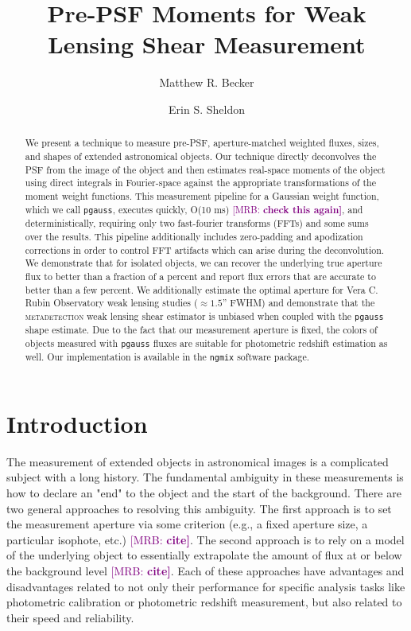 \documentclass[twocolappendix, appendixfloats, numberedappendix, twocolumn, apj]{openjournal}
\newcommand{\mrb}[1]{\textcolor{purple}{[MRB: \bf #1]}\xspace}
\newcommand{\mdet}{\textsc{metadetection}\xspace}
\newcommand{\pgauss}{\texttt{pgauss}\xspace}
\begin{document}
\title{Pre-PSF Moments for Weak Lensing Shear Measurement}

\author{Matthew R. Becker}
\author{Erin S. Sheldon}

\begin{abstract}
  We present a technique to measure pre-PSF, aperture-matched weighted fluxes, sizes,
  and shapes of extended astronomical objects. Our technique directly deconvolves the
  PSF from the image of the object and then estimates real-space moments of the object
  using direct integrals in Fourier-space against the appropriate transformations of the
  moment weight functions. This measurement pipeline for a Gaussian weight function,
  which we call \pgauss, executes quickly, O(10 ms) \mrb{check this again}, and
  deterministically, requiring only two fast-fourier transforms (FFTs) and some sums
  over the results. This pipeline additionally includes zero-padding and apodization
  corrections in order to control FFT artifacts which can arise during the
  deconvolution. We demonstrate that for isolated objects, we can recover the underlying
  true aperture flux to better than a fraction of a percent and report flux errors that
  are accurate to better than a few percent. We additionally estimate the optimal
  aperture for Vera C. Rubin Observatory weak lensing studies ($\approx1.5$'' FWHM) and
  demonstrate that the \mdet weak lensing shear estimator is unbiased when coupled with
  the \pgauss shape estimate. Due to the fact that our measurement aperture is fixed,
  the colors of objects measured with \pgauss fluxes are suitable for photometric
  redshift estimation as well. Our implementation is available in the \texttt{ngmix}
  software package.
\end{abstract}

\section{Introduction}\label{sec:intro}

The measurement of extended objects in astronomical images is a complicated subject with a long
history. The fundamental ambiguity in these measurements is how to declare an "end" to the object
and the start of the background. There are two general approaches to resolving this ambiguity. The
first approach is to set the measurement aperture via some criterion (e.g., a fixed aperture size,
a particular isophote, etc.) \mrb{cite}. The second approach is to rely on a model of the underlying object to
essentially extrapolate the amount of flux at or below the background level \mrb{cite}. Each of these approaches
have advantages and disadvantages related to not only their performance for specific analysis tasks
like photometric calibration or photometric redshift measurement, but also related to their speed and
reliability.
\end{document}
